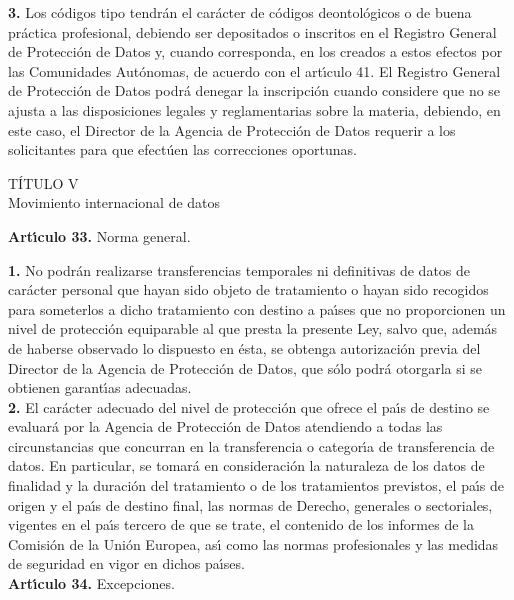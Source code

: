 {\bf 3.} Los c\'odigos tipo tendr\'an el car\'acter de c\'odigos 
deontol\'ogicos o de buena pr\'actica profesional, debiendo ser depositados o 
inscritos en el Registro General de Protecci\'on de Datos y, cuando corresponda,
en los creados a estos efectos por las Comunidades Aut\'onomas, de acuerdo con 
el art\'{\i}culo 41. El Registro General de Protecci\'on de Datos podr\'a 
denegar la inscripci\'on cuando considere que no se ajusta a las disposiciones 
legales y reglamentarias sobre la materia, debiendo, en este caso, el Director 
de la Agencia de Protecci\'on de Datos requerir a los solicitantes para que 
efect\'uen las correcciones oportunas.
\begin{center}
{\LARGE T\'ITULO V}\\
{\large Movimiento internacional de datos}
\end{center}
\vspace{0.3cm}
{\large {\bf Art\'{\i}culo 33.} Norma general.}

{\bf 1.} No podr\'an realizarse transferencias temporales ni definitivas de 
datos de car\'acter personal que hayan sido objeto de tratamiento o hayan sido 
recogidos para someterlos a dicho tratamiento con destino a pa\'{\i}ses que no 
proporcionen un nivel de protecci\'on equiparable al que presta la presente 
Ley, salvo que, adem\'as de haberse observado lo dispuesto en \'esta, se 
obtenga autorizaci\'on previa del Director de la Agencia de Protecci\'on de 
Datos, que s\'olo podr\'a otorgarla si se obtienen garant\'{\i}as adecuadas.\\

{\bf 2.} El car\'acter adecuado del nivel de protecci\'on que ofrece el 
pa\'{\i}s de destino se evaluar\'a por la Agencia de Protecci\'on de Datos 
atendiendo a todas las circunstancias que concurran en la transferencia o 
categor\'{\i}a de transferencia de datos. En particular, se tomar\'a en 
consideraci\'on la naturaleza de los datos de finalidad y la duraci\'on del 
tratamiento o de los tratamientos previstos, el pa\'{\i}s de origen y el 
pa\'{\i}s de destino final, las normas de Derecho, generales o sectoriales, 
vigentes en el pa\'{\i}s tercero de que se trate, el contenido de los informes 
de la Comisi\'on de la Uni\'on Europea, as\'{\i} como las normas profesionales 
y las medidas de seguridad en vigor en dichos pa\'{\i}ses.
\vspace{0.3cm}\\
{\large {\bf Art\'{\i}culo 34.} Excepciones.}


